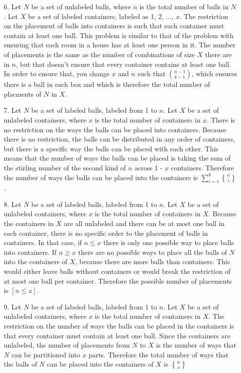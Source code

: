 \documentclass[10pt,a4paper]{report}
\DeclareRobustCommand{\stirling}{\genfrac\{\}{0pt}{}}
\begin{document}
\begin{enumerate}
		\item[6.] Let $N$ be a set of unlabeled balls, where $n$ is the total number of balls in $N$.  Let $X$ be a set of labeled containers, labeled as 1, 2, ..., $x$.  The restriction on the placement of balls into containers is such that each container must contain at least one ball.  This problem is similar to that of the problem with ensuring that each room in a house has at least one person in it.  The number of placements is the same as the number of combinations of size $X$ there are in $n$, but that doesn't ensure that every container contains at least one ball.  In order to ensure that, you change $x$ and $n$ such that $\binom{n-1}{k-1}$, which ensures there is a ball in each box and which is therefore the total number of placments of $N$ in $X$.
		
		\item[7.] Let $N$ be a set of labeled balls, labeled from 1 to $n$.  Let $X$ be a set of unlabeled containers, where $x$ is the total number of containers in $x$.  There is no restriction on the ways the balls can be placed into containers.  Because there is no restriction, the balls can be distributed in any order of containers, but there is a specific way the balls can be placed with each other.  This means that the number of ways the balls can be placed is taking the sum of the stirling number of the second kind of $n$ across 1 - $x$ containers.  Therefore the number of ways the balls can be placed into the containers is $\sum_{i=1}^{k}\stirling{n}{i}$.
		
		\item[8.] Let $N$ be a set of labeled balls, labeled from 1 to $n$.  Let $X$ be a set of unlabeled containers, where $x$ is the total number of containers in $X$.  Because the containers in $X$ are all unlabeled and there can be at most one ball in each container, there is no specific order to the placement of balls in containers.  In that case, if $n\leq x$ there is only one possible way to place balls into containers.  If $n\geq x$ there are no possible ways to place all the balls of $N$ into the containers of $X$, because there are more balls than containers.  This would either leave balls without containers or would break the restriction of at most one ball per container.  Therefore the possible number of placements is $[n\leq x]$.
		
		\item[9.] Let $N$ be a set of labeled balls, labeled from 1 to $n$.  Let $X$ be a set of unlabeled containers, where $x$ is the total number of containers in $X$.  The restriction on the number of ways the balls can be placed in the containers is that every container must contain at least one ball.  Since the containers are unlabeled, the number of placements from $N$ to $X$ is the number of ways that $N$ can be partitioned into $x$ parts.  Therefore the total number of ways that the balls of $N$ can be placed into the containers of $X$ is $\stirling{n}{x}$
		

\end{enumerate}
\end{document}
